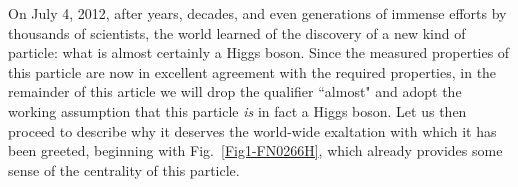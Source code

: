 \documentclass[12pt]{iopart}
\begin{document}
On July 4, 2012, after years, decades, and even generations of immense efforts by thousands of scientists, the world learned of the discovery of a new kind of particle: what is almost certainly a Higgs boson. Since the measured properties of this particle are now in excellent agreement with the required properties, in the remainder of this article we will drop the qualifier ``almost" and adopt the working assumption that this particle \textit{is} in fact a Higgs boson. Let us then proceed to describe why it deserves the world-wide exaltation with which it has been greeted, beginning with Fig.~\ref{Fig1-FN0266H}, which already provides some sense of the centrality of this particle. 
\end{document}

